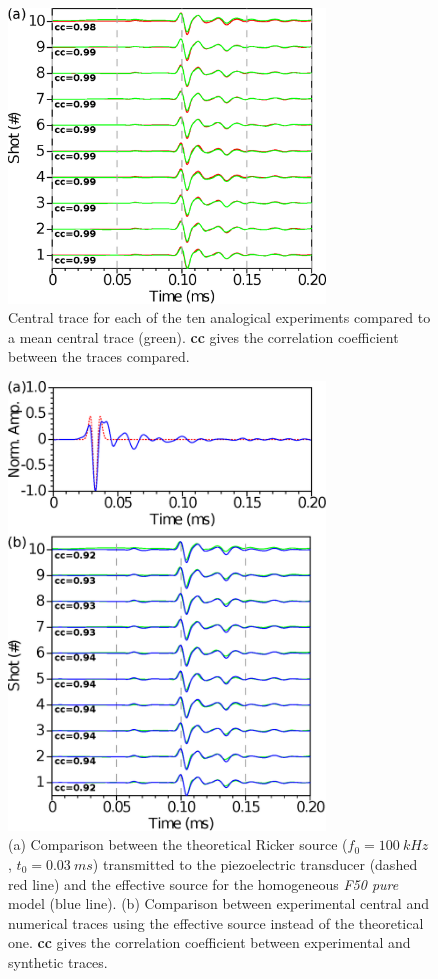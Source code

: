 \documentclass[manuscript,revised]{geophysics}
\begin{document}
\begin{figure}[!h]
\centering
\includegraphics[width=0.75\textwidth]{fig/musc_F50_CT.eps}
\caption{Central trace for each of the ten analogical experiments compared to a mean central trace (green). \textbf{cc} gives the correlation coefficient between the traces compared.}
\label{panel_central_traces_cc}
\end{figure}

\begin{figure}[!h]
\centering
\includegraphics[width=0.75\textwidth]{fig/spec_F50_CT_COMP.eps}
\caption{(a) Comparison between the theoretical Ricker source ($f_{0}=100\ kHz$, $t_{0}=0.03\ ms$) transmitted to the piezoelectric transducer (dashed red line) and the effective source for the homogeneous \textit{F50 pure} model (blue line). (b) Comparison between experimental central and numerical traces using the effective source instead of the theoretical one. \textbf{cc} gives the correlation coefficient between experimental and synthetic traces.}
\label{panel_srcest_2d_mean_comp}
\end{figure}
\end{document}
